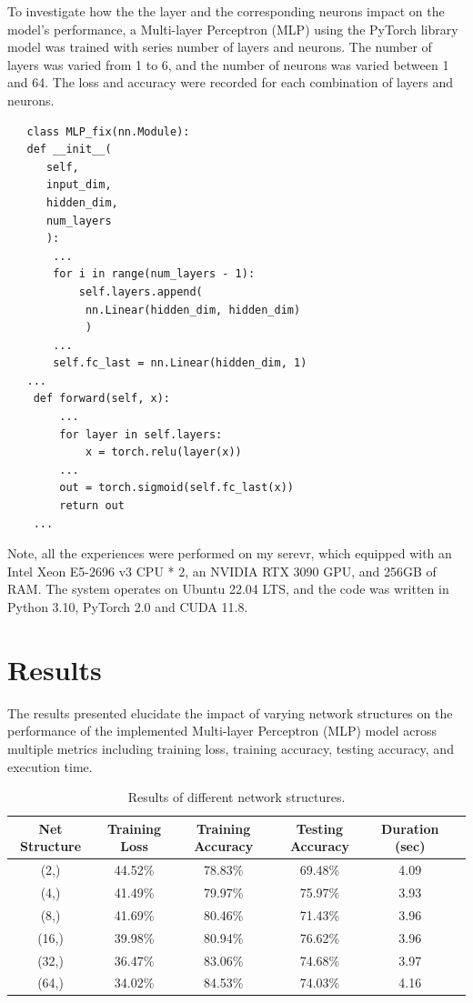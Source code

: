 \documentclass[10pt,twocolumn,letterpaper]{article}
\begin{document}
To investigate how the the layer and the corresponding neurons impact on the model's performance, a Multi-layer Perceptron (MLP) using the PyTorch library model was trained with series number of layers and neurons. The number of layers was varied from 1 to 6, and the number of neurons was varied between 1 and 64. The loss and accuracy were recorded for each combination of layers and neurons.
\begin{lstlisting}
   class MLP_fix(nn.Module):
   def __init__(
      self, 
      input_dim, 
      hidden_dim, 
      num_layers
      ):
       ...
       for i in range(num_layers - 1):
           self.layers.append(
            nn.Linear(hidden_dim, hidden_dim)
            )
       ...
       self.fc_last = nn.Linear(hidden_dim, 1)
   ...
    def forward(self, x):
        ...
        for layer in self.layers:
            x = torch.relu(layer(x))
        ...
        out = torch.sigmoid(self.fc_last(x))
        return out
    ...
   \end{lstlisting}
Note, all the experiences were performed on my serevr, which equipped with an Intel Xeon E5-2696 v3 CPU * 2, an NVIDIA RTX 3090 GPU, and 256GB of RAM. The system operates on Ubuntu 22.04 LTS, and the code was written in Python 3.10, PyTorch 2.0 and CUDA 11.8.

\section{Results}

The results presented elucidate the impact of varying network structures on the performance of the implemented Multi-layer Perceptron (MLP) model across multiple metrics including training loss, training accuracy, testing accuracy, and execution time.

\begin{table}[h]
   \centering
   \begin{tabular}{|c|c|c|c|c|c|}
      \hline
      Net Structure & Training Loss & Training Accuracy & Testing Accuracy & Duration (sec) \\
      \hline
      (2,)          & 44.52\%       & 78.83\%           & 69.48\%          & 4.09           \\
      (4,)          & 41.49\%       & 79.97\%           & 75.97\%          & 3.93           \\
      (8,)          & 41.69\%       & 80.46\%           & 71.43\%          & 3.96           \\
      (16,)         & 39.98\%       & 80.94\%           & 76.62\%          & 3.96           \\
      (32,)         & 36.47\%       & 83.06\%           & 74.68\%          & 3.97           \\
      (64,)         & 34.02\%       & 84.53\%           & 74.03\%          & 4.16           \\
      \hline
   \end{tabular}
   \caption{Results of different network structures.}
   \label{tab:net_struct_results}
\end{table}
\end{document}
